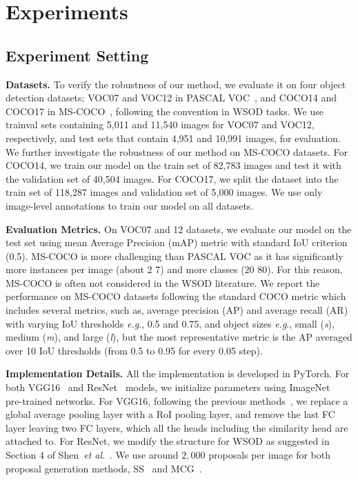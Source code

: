 \documentclass[runningheads]{llncs}
\makeatletter
\DeclareRobustCommand\onedot{\futurelet\@let@token\@onedot}
\def\onedot{.} \def\eg{\emph{e.g}\onedot, } \def\Eg{\emph{E.g}\onedot}
\def\etal{\emph{et al}\onedot}
\makeatother
\begin{document}
\section{Experiments}

\subsection{Experiment Setting}
\label{sec:experiments}
\noindent\textbf{Datasets.}
To verify the robustness of our method, we evaluate it on four object detection datasets; VOC07 and VOC12 in PASCAL VOC~\cite{Everingham15}, and COCO14 and COCO17 in MS-COCO~\cite{lin2014microsoft}, following the convention in WSOD tasks.
We use trainval sets containing 5,011 and 11,540 images for VOC07 and VOC12, respectively, and test sets that contain 4,951 and 10,991 images, for evaluation.
We further investigate the robustness of our method on MS-COCO datasets.
For COCO14, we train our model on the train set of 82,783 images and test it with the validation set of 40,504 images.
For COCO17, we split the dataset into the train set of 118,287 images and validation set of 5,000 images.
We use only image-level annotations to train our model on all datasets.



\noindent\textbf{Evaluation Metrics.}
On VOC07 and 12 datasets, we evaluate our model on the test set using mean Average Precision (mAP) metric with standard IoU criterion (0.5).
MS-COCO is more challenging than PASCAL VOC as it has significantly more instances per image (about $2$ \vs{} $7$) and more classes ($20$ \vs{} $80$). 
For this reason, MS-COCO is often not considered in the WSOD literature.
We report the performance on MS-COCO datasets following the standard COCO metric which includes several metrics, such as, average precision (AP) and average recall (AR) with varying IoU thresholds \eg 0.5 and 0.75, and object sizes \eg small (\textit{s}), medium (\textit{m}), and large (\textit{l}), but the most representative metric is the AP averaged over 10 IoU thresholds (from 0.5 to 0.95 for every 0.05 step). 

\noindent\textbf{Implementation Details.}
All the implementation is developed in PyTorch.
For both VGG16~\cite{VGG:Simonyan2014} and ResNet~\cite{he2016deep} models, we initialize parameters using ImageNet~\cite{deng2009imagenet} pre-trained networks.
For VGG16, following the previous methods~\cite{ren2020instance,huang2020comprehensive}, we replace a global average pooling layer with a RoI pooling layer, and remove the last FC layer leaving two FC layers, which all the heads including the similarity head are attached to.
For ResNet, we modify the structure for WSOD as suggested in Section 4 of Shen~\etal~\cite{shen2020enabling}.
We use around $2{,}000$ proposals per image for both proposal generation methods, SS~\cite{uijlings2013selective} and MCG~\cite{arbelaez2014multiscale}.
\end{document}
